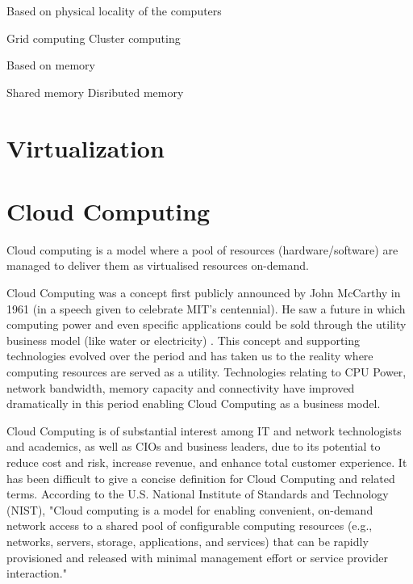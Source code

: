 \documentclass[12pt,a4paper]{report}
\begin{document}
Based on physical locality of the computers

Grid computing
Cluster computing

Based on memory 

Shared memory
Disributed memory









\section{Virtualization}

\section{Cloud Computing}

Cloud computing is a model where a pool of resources (hardware/software) are
managed to deliver them as virtualised resources on-demand.


Cloud Computing was a concept first publicly announced by John McCarthy in 1961 
(in a speech given to celebrate MIT's centennial). He saw a future in which computing 
power and even specific applications could be sold through the utility 
business model (like water or electricity) \cite{garfinkel1999architects} .
This concept and  supporting technologies evolved over the period and has taken us 
to the reality where computing resources are served as a utility. 
Technologies relating to CPU Power, network bandwidth, memory capacity 
and connectivity have improved dramatically in this period enabling Cloud Computing as 
a business model.

Cloud Computing is of substantial interest among IT and network technologists
and academics, as well as CIOs and business leaders, due to its potential to 
reduce cost and risk, increase revenue, and enhance total customer experience.\cite{weinman2011future}
It has been difficult to give a concise definition for Cloud Computing 
and related terms. According to the U.S. National Institute of Standards 
and Technology (NIST), \cite{mell2009nist}  "Cloud computing is a model for enabling convenient,
on-demand network access to a shared pool of configurable computing resources
(e.g., networks, servers, storage, applications, and services) that can 
be rapidly provisioned and released with minimal management 
effort or service provider interaction." 
\end{document}
